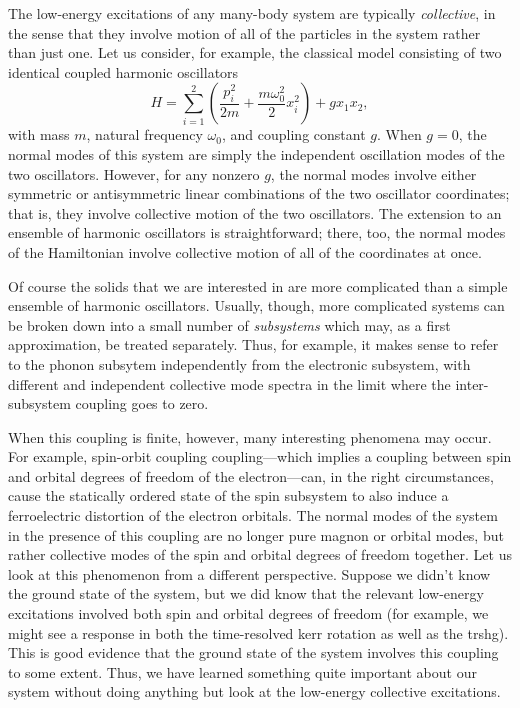 The low-energy excitations of any many-body system are typically \emph{collective}, in the sense that they involve motion of all of the particles in the system rather than just one.
Let us consider, for example, the classical model consisting of two identical coupled harmonic oscillators
\begin{equation}
H = \sum_{i=1}^2\left(\frac{p_i^2}{2m}+\frac{m\omega_0^2}{2}x_i^2\right)+gx_1x_2,
\end{equation}
with mass $m$, natural frequency $\omega_0$, and coupling constant $g$.
When $g=0$, the normal modes of this system are simply the independent oscillation modes of the two oscillators.
However, for any nonzero $g$, the normal modes involve either symmetric or antisymmetric linear combinations of the two oscillator coordinates; that is, they involve collective motion of the two oscillators.
The extension to an ensemble of harmonic oscillators is straightforward; there, too, the normal modes of the Hamiltonian involve collective motion of all of the coordinates at once.

Of course the solids that we are interested in are more complicated than a simple ensemble of harmonic oscillators.
Usually, though, more complicated systems can be broken down into a small number of \emph{subsystems} which may, as a first approximation, be treated separately.
Thus, for example, it makes sense to refer to the phonon subsytem independently from the electronic subsystem, with different and independent collective mode spectra in the limit where the inter-subsystem coupling goes to zero.

When this coupling is finite, however, many interesting phenomena may occur.
For example, spin-orbit coupling coupling---which implies a coupling between spin and orbital degrees of freedom of the electron---can, in the right circumstances, cause the statically ordered state of the spin subsystem to also induce a ferroelectric distortion of the electron orbitals.
The normal modes of the system in the presence of this coupling are no longer pure magnon or orbital modes, but rather collective modes of the spin and orbital degrees of freedom together.
Let us look at this phenomenon from a different perspective.
Suppose we didn't know the ground state of the system, but we did know that the relevant low-energy excitations involved both spin and orbital degrees of freedom (for example, we might see a response in both the time-resolved kerr rotation as well as the \gls{trshg}).
This is good evidence that the ground state of the system involves this coupling to some extent.
Thus, we have learned something quite important about our system without doing anything but look at the low-energy collective excitations.

